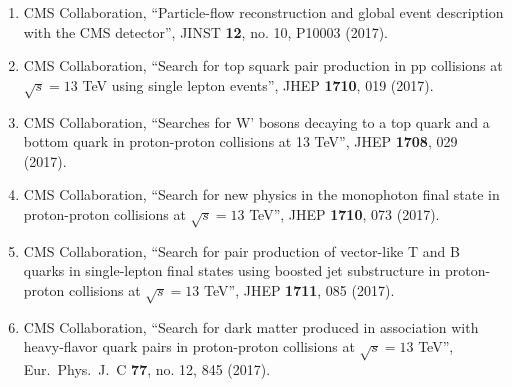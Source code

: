 \begin{enumerate}
\item CMS Collaboration, ``Particle-flow reconstruction and global event description with the CMS detector'', JINST {\bf 12}, no. 10, P10003 (2017).

\item CMS Collaboration, ``Search for top squark pair production in pp collisions at $ \sqrt{s}=13 $ TeV using single lepton events'', JHEP {\bf 1710}, 019 (2017).

\item CMS Collaboration, ``Searches for W' bosons decaying to a top quark and a bottom quark in proton-proton collisions at 13 TeV'', JHEP {\bf 1708}, 029 (2017).

\item CMS Collaboration, ``Search for new physics in the monophoton final state in proton-proton collisions at $ \sqrt{s}=13 $ TeV'', JHEP {\bf 1710}, 073 (2017).

\item CMS Collaboration, ``Search for pair production of vector-like T and B quarks in single-lepton final states using boosted jet substructure in proton-proton collisions at  $\sqrt{s}=13$ TeV'', JHEP {\bf 1711}, 085 (2017).

\item CMS Collaboration, ``Search for dark matter produced in association with heavy-flavor quark pairs in proton-proton collisions at $\sqrt{s}=13$ TeV'', Eur.\ Phys.\ J.\ C {\bf 77}, no. 12, 845 (2017).


\end{enumerate}
